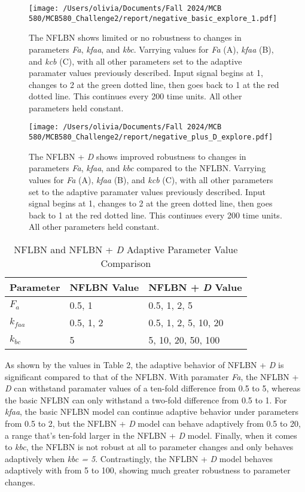 \documentclass{article}
\begin{document}
\begin{figure}[H]
    \centering
    \texttt{[image: /Users/olivia/Documents/Fall 2024/MCB 580/MCB580\_Challenge2/report/negative\_basic\_explore\_1.pdf]}
    \caption{The NFLBN shows limited or no robustness to changes in parameters \textit{Fa}, \textit{kfaa}, and \textit{kbc}. Varrying values for \textit{Fa} (A), \textit{kfaa} (B), and \textit{kcb} (C), with all other parameters set to the adaptive paramater values previously described. Input signal begins at 1, changes to 2 at the green dotted line, then goes back to 1 at the red dotted line. This continues every 200 time units. All other parameters held constant.}
    \label{fig:7}
\end{figure}

\begin{figure}[H]
    \centering
    \texttt{[image: /Users/olivia/Documents/Fall 2024/MCB 580/MCB580\_Challenge2/report/negative\_plus\_D\_explore.pdf]}
    \caption{The NFLBN + \textit{D} shows improved robustness to changes in parameters \textit{Fa}, \textit{kfaa}, and \textit{kbc} compared to the NFLBN. Varrying values for \textit{Fa} (A), \textit{kfaa} (B), and \textit{kcb} (C), with all other parameters set to the adaptive paramater values previously described. Input signal begins at 1, changes to 2 at the green dotted line, then goes back to 1 at the red dotted line. This continues every 200 time units. All other parameters held constant.}
    \label{fig:8}
\end{figure}

\begin{table}[h]
    \centering
    \caption{NFLBN and NFLBN + \textit{D} Adaptive Parameter Value Comparison}
    \begin{tabular}{@{}lll@{}}
        \toprule
        Parameter & NFLBN Value & NFLBN + \textit{D} Value\\ 
        \midrule
        \(F_a\) & 0.5, 1 & 0.5, 1, 2, 5\\
        \(k_{faa}\) & 0.5, 1, 2 & 0.5, 1, 2, 5, 10, 20 \\
        \(k_{bc}\) & 5 & 5, 10, 20, 50, 100\\
        \bottomrule
    \end{tabular}
    \label{tab:parameters}
\end{table}

As shown by the values in Table 2, the adaptive behavior of NFLBN + \textit{D} is significant compared to that of the NFLBN. With paramater \textit{Fa}, the NFLBN + \textit{D} can withstand paramater values of a ten-fold difference from 0.5 to 5, whereas the basic NFLBN can only withstand a two-fold difference from 0.5 to 1. For \textit{kfaa}, the basic NFLBN model can continue adaptive behavior under parameters from 0.5 to 2, but the NFLBN + \textit{D} model can behave adaptively from 0.5 to 20, a range that's ten-fold larger in the NFLBN + \textit{D} model. Finally, when it comes to \textit{kbc}, the NFLBN is not robust at all to parameter changes and only behaves adaptively when \textit{kbc = 5}. Contrastingly, the NFLBN + \textit{D} model behaves adaptively with  from 5 to 100, showing much greater robustness to parameter changes.
\end{document}
